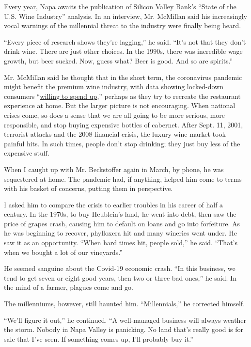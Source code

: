 Every year, Napa awaits the publication of Silicon Valley Bank's ``State
of the U.S. Wine Industry'' analysis. In an interview, Mr. McMillan said
his increasingly vocal warnings of the millennial threat to the industry
were finally being heard.

``Every piece of research shows they're lagging,'' he said. ``It's not
that they don't drink wine. There are just other choices. In the 1990s,
there was incredible wage growth, but beer sucked. Now, guess what? Beer
is good. And so are spirits.''

Mr. McMillan said he thought that in the short term, the coronavirus
pandemic might benefit the premium wine industry, with data showing
locked-down consumers
``\href{https://svbwine.blogspot.com/2020/05/post-lock-down-opportunity-for-wineries.html}{willing
to spend up},'' perhaps as they try to recreate the restaurant
experience at home. But the larger picture is not encouraging. When
national crises come, so does a sense that we are all going to be more
serious, more responsible, and stop buying expensive bottles of
cabernet. After Sept. 11, 2001, terrorist attacks and the 2008 financial
crisis, the luxury wine market took painful hits. In such times, people
don't stop drinking; they just buy less of the expensive stuff.

When I caught up with Mr. Beckstoffer again in March, by phone, he was
sequestered at home. The pandemic had, if anything, helped him come to
terms with his basket of concerns, putting them in perspective.

I asked him to compare the crisis to earlier troubles in his career of
half a century. In the 1970s, to buy Heublein's land, he went into debt,
then saw the price of grapes crash, causing him to default on loans and
go into forfeiture. As he was beginning to recover, phylloxera hit and
many wineries went under. He saw it as an opportunity. ``When hard times
hit, people sold,'' he said. ``That's when we bought a lot of our
vineyards.''

He seemed sanguine about the Covid-19 economic crash. ``In this
business, we tend to get seven or eight good years, then two or three
bad ones,'' he said. In the mind of a farmer, plagues come and go.

The millenniums, however, still haunted him. ``Millennials,'' he
corrected himself.

``We'll figure it out,'' he continued. ``A well-managed business will
always weather the storm. Nobody in Napa Valley is panicking. No land
that's really good is for sale that I've seen. If something comes up,
I'll probably buy it.''

